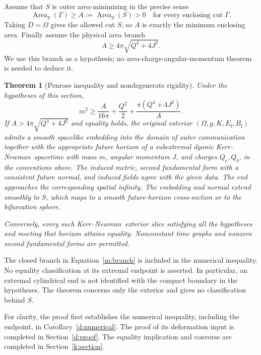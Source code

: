 \documentclass[11pt]{article}
\numberwithin{equation}{section}
\newtheorem{theorem}{Theorem}[section]
\theoremstyle{definition}
\theoremstyle{remark}
\newcommand{\KN}{Kerr--Newman}
\DeclareMathOperator{\Area}{Area}
\begin{document}
Assume that \(S\) is outer area-minimizing in the precise sense
\begin{equation}\label{m:area}
 \Area_g(\Gamma)\ge A:=\Area_g(S)>0
 \quad\text{for every enclosing cut }\Gamma.
\end{equation}
Taking \(D=\Omega\) gives the allowed cut \(S\), so \(A\) is exactly the
minimum enclosing area. Finally assume the physical area branch
\begin{equation}\label{m:branch}
 A\ge4\pi\sqrt{Q^4+4J^2}.
\end{equation}
We use this branch as a hypothesis; no area-charge-angular-momentum theorem
is needed to deduce it.

\begin{theorem}[Penrose inequality and nondegenerate rigidity]\label{m:main}
Under the hypotheses of this section,
\begin{equation}\label{m:penrose}
 \boxed{\displaystyle
 m^2\ge\frac{A}{16\pi}+\frac{Q^2}{2}
           +\frac{\pi(Q^4+4J^2)}A.}
\end{equation}
If \(A>4\pi\sqrt{Q^4+4J^2}\) and equality holds, the original exterior
\((\Omega,g,K,E_{\mathrm f},B_{\mathrm f})\) admits a smooth spacelike
embedding into the domain of outer communication together with the
appropriate future horizon of a subextremal dyonic \KN\ spacetime with
mass \(m\), angular momentum \(J\), and charges \(Q_e,Q_b\), in the
conventions above. The induced metric, second fundamental form with a
consistent future normal, and induced fields agree with the given data.
The end approaches the corresponding spatial infinity. The embedding and
normal extend smoothly to \(S\), which maps to a smooth future-horizon
cross-section or to the bifurcation sphere.

Conversely, every such \KN\ exterior slice satisfying all the hypotheses
and meeting that horizon attains equality. Nonconstant time graphs and
nonzero second fundamental forms are permitted.
\end{theorem}

The closed branch in Equation~\eqref{m:branch} is included in the numerical
inequality. No equality classification at its extremal endpoint is asserted.
In particular, an extremal cylindrical end is not identified with the compact
boundary in the hypotheses. The theorem concerns only the exterior and gives
no classification behind \(S\).

For clarity, the proof first establishes the numerical inequality, including
the endpoint, in Corollary~\ref{d:numerical}. The proof of its deformation
input is completed in Section~\ref{d:proof}. The equality implication and
converse are completed in Section~\ref{k:section}.














\end{document}
